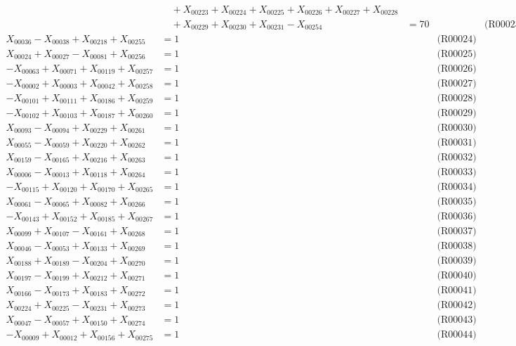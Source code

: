 \documentclass[a4paper,10pt]{article}
\begin{document}
{\begin{align}
&\quad  + X_{00223} + X_{00224} + X_{00225} + X_{00226} + X_{00227} + X_{00228} \\[0.5ex]
&\quad  + X_{00229} + X_{00230} + X_{00231} - X_{00254} &= 70 && \text{(R00023)} \\
X_{00036} - X_{00038} + X_{00218} + X_{00255} &= 1 && \text{(R00024)} \\
X_{00024} + X_{00027} - X_{00081} + X_{00256} &= 1 && \text{(R00025)} \\
-X_{00063} + X_{00071} + X_{00119} + X_{00257} &= 1 && \text{(R00026)} \\
-X_{00002} + X_{00003} + X_{00042} + X_{00258} &= 1 && \text{(R00027)} \\
-X_{00101} + X_{00111} + X_{00186} + X_{00259} &= 1 && \text{(R00028)} \\
-X_{00102} + X_{00103} + X_{00187} + X_{00260} &= 1 && \text{(R00029)} \\
X_{00093} - X_{00094} + X_{00229} + X_{00261} &= 1 && \text{(R00030)} \\
X_{00055} - X_{00059} + X_{00220} + X_{00262} &= 1 && \text{(R00031)} \\
X_{00159} - X_{00165} + X_{00216} + X_{00263} &= 1 && \text{(R00032)} \\
X_{00006} - X_{00013} + X_{00118} + X_{00264} &= 1 && \text{(R00033)} \\
-X_{00115} + X_{00120} + X_{00170} + X_{00265} &= 1 && \text{(R00034)} \\
X_{00061} - X_{00065} + X_{00082} + X_{00266} &= 1 && \text{(R00035)} \\
-X_{00143} + X_{00152} + X_{00185} + X_{00267} &= 1 && \text{(R00036)} \\
X_{00099} + X_{00107} - X_{00161} + X_{00268} &= 1 && \text{(R00037)} \\
X_{00046} - X_{00053} + X_{00133} + X_{00269} &= 1 && \text{(R00038)} \\
X_{00188} + X_{00189} - X_{00204} + X_{00270} &= 1 && \text{(R00039)} \\
X_{00197} - X_{00199} + X_{00212} + X_{00271} &= 1 && \text{(R00040)} \\
\allowbreak
X_{00166} - X_{00173} + X_{00183} + X_{00272} &= 1 && \text{(R00041)} \\
X_{00224} + X_{00225} - X_{00231} + X_{00273} &= 1 && \text{(R00042)} \\
X_{00047} - X_{00057} + X_{00150} + X_{00274} &= 1 && \text{(R00043)} \\
-X_{00009} + X_{00012} + X_{00156} + X_{00275} &= 1 && \text{(R00044)} \\

\end{align}}
\end{document}
